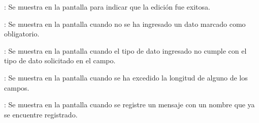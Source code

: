 \begin{Citemize}
	\item {}: Se muestra en la pantalla  para indicar que la edición fue exitosa.
	\item {}: Se muestra en la pantalla  cuando no se ha ingresado un dato marcado como obligatorio.
	\item {}: Se muestra en la pantalla  cuando el tipo de dato ingresado no cumple con el tipo de dato solicitado en el campo.
	\item {}: Se muestra en la pantalla  cuando se ha excedido la longitud de alguno de los campos.
	\item {}: Se muestra en la pantalla  cuando se registre un mensaje con un nombre que ya se encuentre registrado.
\end{Citemize}
